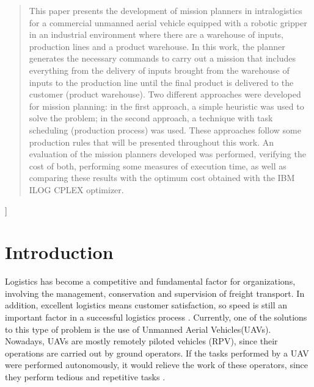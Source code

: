 \documentclass[conference,harvard,brazil,english]{sbatex}
\begin{document}
\begin{abstract}
 This paper presents the development of mission planners in intralogistics for a commercial unmanned aerial vehicle equipped with a robotic gripper in an industrial environment where there are a warehouse of inputs, production lines and a product warehouse. In this work, the planner generates the necessary commands to carry out a mission that includes everything from the delivery of inputs brought from the warehouse of inputs to the production line until the final product is delivered to the customer (product warehouse). Two different approaches were developed for mission planning: in the first approach, a simple heuristic was used to solve the problem; in the second approach, a technique with task scheduling (production process) was used. These approaches follow some production rules that will be presented throughout this work. An evaluation of the mission planners developed was performed, verifying the cost of both, performing some measures of execution time, as well as comparing these results with the optimum cost obtained with the IBM ILOG CPLEX optimizer.
\end{abstract}

]


\section{Introduction}
\label{sec:introduction}


Logistics has become a competitive and fundamental factor for organizations, involving the management, conservation and supervision of freight transport. In addition, excellent logistics means customer satisfaction, so speed is still an important factor in a successful logistics process \cite{drone4logistic}. Currently, one of the solutions to this type of problem is the use of Unmanned Aerial Vehicles(UAVs). Nowadays, UAVs are mostly remotely piloted vehicles (RPV), since their operations are carried out by ground operators. If the tasks performed by a UAV were performed autonomously, it would relieve the work of these operators, since they perform tedious and repetitive tasks \cite{pascarella2013autonomic}.
\end{document}
